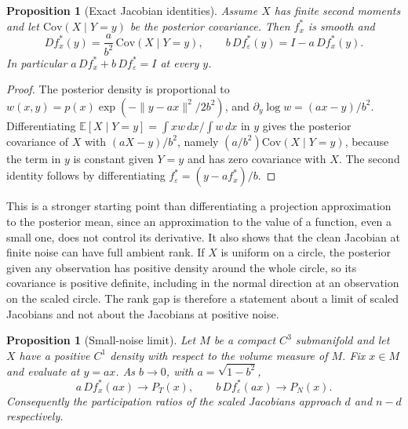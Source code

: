 \documentclass[11pt,a4paper]{article}
\newtheorem{proposition}[theorem]{Proposition}
\theoremstyle{definition}
\theoremstyle{remark}
\begin{document}
\begin{proposition}[Exact Jacobian identities]\label{prop:rankgap}
Assume $X$ has finite second moments and let $\mathrm{Cov}(X\mid Y=y)$ be the
posterior covariance. Then $f_x^\ast$ is smooth and
\[
Df_x^\ast(y)=\frac{a}{b^2}\,\mathrm{Cov}(X\mid Y=y),
\qquad
b\,Df_\varepsilon^\ast(y)=I-a\,Df_x^\ast(y).
\]
In particular $a\,Df_x^\ast+b\,Df_\varepsilon^\ast=I$ at every $y$.
\end{proposition}

\begin{proof}
The posterior density is proportional to $w(x,y)=p(x)\exp(-\|y-ax\|^2/2b^2)$,
and $\partial_y\log w=(ax-y)/b^2$. Differentiating
$\mathbb{E}[X\mid Y=y]=\int xw\,dx/\int w\,dx$ in $y$ gives the posterior
covariance of $X$ with $(aX-y)/b^2$, namely $(a/b^2)\mathrm{Cov}(X\mid Y=y)$,
because the term in $y$ is constant given $Y=y$ and has zero covariance with
$X$. The second identity follows by differentiating
$f_\varepsilon^\ast=(y-af_x^\ast)/b$.
\end{proof}

This is a stronger starting point than differentiating a projection
approximation to the posterior mean, since an approximation to the value of a
function, even a small one, does not control its derivative. It also shows
that the clean Jacobian at finite noise can have full ambient rank. If $X$ is
uniform on a circle, the posterior given any observation has positive density
around the whole circle, so its covariance is positive definite, including in
the normal direction at an observation on the scaled circle. The rank gap is
therefore a statement about a limit of scaled Jacobians and not about the
Jacobians at positive noise.

\begin{proposition}[Small-noise limit]\label{prop:rankgaplimit}
Let $M$ be a compact $C^3$ submanifold and let $X$ have a positive $C^1$
density with respect to the volume measure of $M$. Fix $x\in M$ and evaluate at
$y=ax$. As $b\to0$, with $a=\sqrt{1-b^2}$,
\[
a\,Df_x^\ast(ax)\longrightarrow P_T(x),
\qquad
b\,Df_\varepsilon^\ast(ax)\longrightarrow P_N(x).
\]
Consequently the participation ratios of the scaled Jacobians approach $d$ and
$n-d$ respectively.
\end{proposition}
\end{document}
